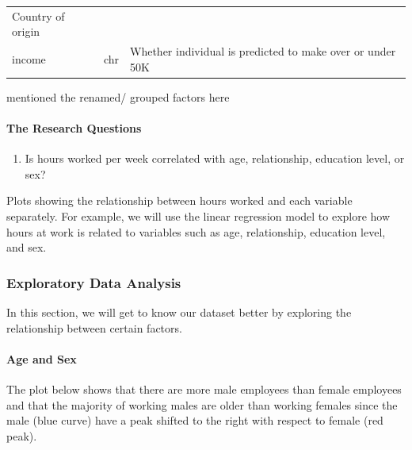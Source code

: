 \documentclass[]{article}
\providecommand{\tightlist}{%
  \setlength{\itemsep}{0pt}\setlength{\parskip}{0pt}}
\let\oldparagraph\paragraph
\renewcommand{\paragraph}[1]{\oldparagraph{#1}\mbox{}}
\begin{document}
\begin{longtable}[]{@{}lll@{}}
\begin{minipage}[t]{0.26\columnwidth}
Country of origin\strut
\end{minipage}\tabularnewline
\begin{minipage}[t]{0.35\columnwidth}\raggedright
income\strut
\end{minipage} & \begin{minipage}[t]{0.30\columnwidth}\raggedright
chr\strut
\end{minipage} & \begin{minipage}[t]{0.26\columnwidth}\raggedright
Whether individual is predicted to make over or under 50K\strut
\end{minipage}\tabularnewline
\bottomrule
\end{longtable}

mentioned the renamed/ grouped factors here

\hypertarget{the-research-questions}{%
\paragraph{The Research Questions}\label{the-research-questions}}

\begin{enumerate}
\def\labelenumi{\arabic{enumi}.}
\tightlist
\item
  Is hours worked per week correlated with age, relationship, education
  level, or sex?
\end{enumerate}

Plots showing the relationship between hours worked and each variable
separately. For example, we will use the linear regression model to
explore how hours at work is related to variables such as age,
relationship, education level, and sex.

\hypertarget{exploratory-data-analysis}{%
\subsubsection{Exploratory Data
Analysis}\label{exploratory-data-analysis}}

In this section, we will get to know our dataset better by exploring the
relationship between certain factors.

\hypertarget{age-and-sex}{%
\paragraph{Age and Sex}\label{age-and-sex}}

The plot below shows that there are more male employees than female
employees and that the majority of working males are older than working
females since the male (blue curve) have a peak shifted to the right
with respect to female (red peak).
\end{document}

